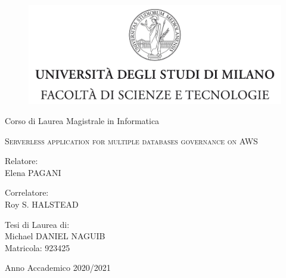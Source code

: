 \documentclass[11pt,a4paper,oneside,
openright]{book}
\begin{document}
\begin{titlepage}

  \begin{figure}
    \centering
    \includegraphics[width=424pt]{chapters/images/tesiSCIENZE_TECNOLOGIE.jpg}
    \vspace{0.5 cm}
  \end{figure}


  \begin{center}
    {\LARGE Corso di Laurea Magistrale in Informatica }
  \end{center}

  \begin{center}
    \vspace{3 cm}
    {\Large \textsc{Serverless application for multiple databases governance on AWS} }
  \end{center}
  \par
  \vspace{3 cm}

  \begin{flushleft}
    Relatore:\\ Elena PAGANI

    \noindent Correlatore:\\ Roy S. HALSTEAD
  \end{flushleft}
  \vspace{1 cm}
  \begin{flushright}
    Tesi di Laurea di:\\ Michael DANIEL NAGUIB\\ Matricola: 923425
  \end{flushright}

  \vfill
  \begin{center}
    {\large Anno Accademico 2020/2021}
  \end{center}
\end{titlepage}

\end{document}
